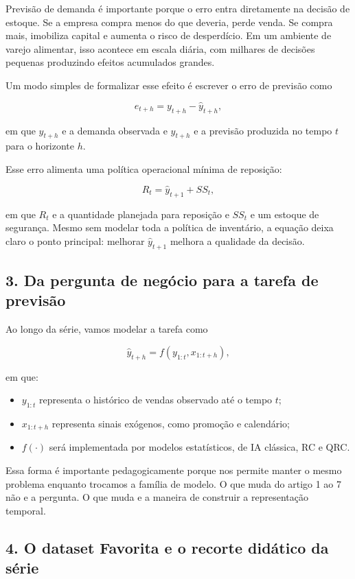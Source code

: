 \documentclass[12pt]{article}
\providecommand{\tightlist}{%
          \setlength{\itemsep}{0pt}\setlength{\parskip}{0pt}}
\begin{document}
Previsão de demanda é importante porque o erro entra diretamente na decisão de estoque. Se a empresa compra menos do que deveria, perde venda. Se compra mais, imobiliza capital e aumenta o risco de desperdício. Em um ambiente de varejo alimentar, isso acontece em escala diária, com milhares de decisões pequenas produzindo efeitos acumulados grandes.

Um modo simples de formalizar esse efeito é escrever o erro de previsão como

\[
e_{t+h} = y_{t+h} - \hat{y}_{t+h},
\]

em que \(y_{t+h}\) e a demanda observada e \(\hat{y}_{t+h}\) e a previsão produzida no tempo \(t\) para o horizonte \(h\).

Esse erro alimenta uma política operacional mínima de reposição:

\[
R_t = \hat{y}_{t+1} + SS_t,
\]

em que \(R_t\) e a quantidade planejada para reposição e \(SS_t\) e um estoque de segurança. Mesmo sem modelar toda a política de inventário, a equação deixa claro o ponto principal: melhorar \(\hat{y}_{t+1}\) melhora a qualidade da decisão.

\subsection{3. Da pergunta de negócio para a tarefa de previsão}\label{3-da-pergunta-de-neguxf3cio-para-a-tarefa-de-previsuxe3o}

Ao longo da série, vamos modelar a tarefa como

\[
\hat{y}_{t+h} = f(y_{1:t}, x_{1:t+h}),
\]

em que:

\begin{itemize}
\tightlist
\item
  \(y_{1:t}\) representa o histórico de vendas observado até o tempo \(t\);
\item
  \(x_{1:t+h}\) representa sinais exógenos, como promoção e calendário;
\item
  \(f(\cdot)\) será implementada por modelos estatísticos, de IA clássica, RC e QRC.
\end{itemize}

Essa forma é importante pedagogicamente porque nos permite manter o mesmo problema enquanto trocamos a família de modelo. O que muda do artigo 1 ao 7 não e a pergunta. O que muda e a maneira de construir a representação temporal.

\subsection{4. O dataset Favorita e o recorte didático da série}\label{4-o-dataset-favorita-e-o-recorte-diduxe1tico-da-suxe9rie}
\end{document}
